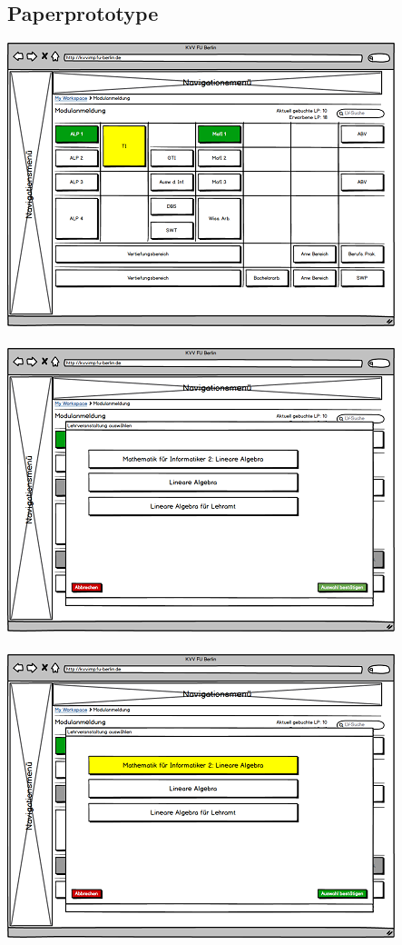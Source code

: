 \documentclass{article}
\begin{document}
\subsection{Paperprototype}

\includegraphics{ucd_ppt_start.png}\\
\\
\includegraphics{ucd_ppt_lv_select.png}\\
\\
\includegraphics{ucd_ppt_lv_selected.png}\\
\end{document}
